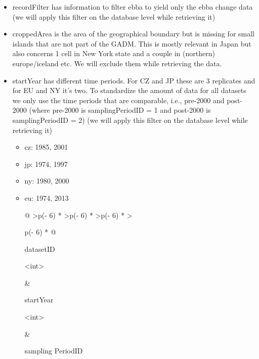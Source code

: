 \documentclass[
  letterpaper,
  DIV=11,
  numbers=noendperiod]{scrreprt}
\begin{document}
\begin{itemize}
\item
  recordFilter has information to filter ebba to yield only the ebba
  change data (we will apply this filter on the database level while
  retrieving it)
\item
  croppedArea is the area of the geographical boundary but is missing
  for small islands that are not part of the GADM. This is mostly
  relevant in Japan but also concerns 1 cell in New York state and a
  couple in (northern) europe/iceland etc. We will exclude them while
  retrieving the data.
\item
  startYear has different time periods. For CZ and JP these are 3
  replicates and for EU and NY it's two. To standardize the amount of
  data for all datasets we only use the time periods that are
  comparable, i.e., pre-2000 and post-2000 (where pre-2000 is
  samplingPeriodID = 1 and post-2000 is samplingPeriodID = 2) (we will
  apply this filter on the database level while retrieving it)

  \begin{itemize}
  \item
    cz: 1985, 2001
  \item
    jp: 1974, 1997
  \item
    ny: 1980, 2000
  \item
    eu: 1974, 2013

    \begin{longtable}[]{@{}
      >{\raggedleft\arraybackslash}p{(\columnwidth - 6\tabcolsep) * }
      >{\raggedleft\arraybackslash}p{(\columnwidth - 6\tabcolsep) * }
      >{\raggedleft\arraybackslash}p{(\columnwidth - 6\tabcolsep) * }
      >{\raggedright\arraybackslash}p{(\columnwidth - 6\tabcolsep) * }@{}}
    \toprule\noalign{}
    \begin{minipage}[b]{\linewidth}\raggedleft
    datasetID

    \hfill\break
    \textless int\textgreater{}\strut
    \end{minipage} & \begin{minipage}[b]{\linewidth}\raggedleft
    startYear

    \hfill\break
    \textless int\textgreater{}\strut
    \end{minipage} & \begin{minipage}[b]{\linewidth}\raggedleft
    sampling PeriodID


\end{minipage}
\end{longtable}
\end{itemize}
\end{itemize}
\end{document}
